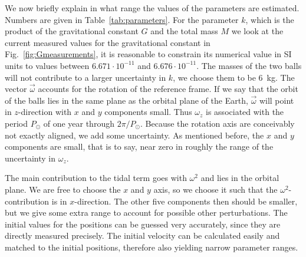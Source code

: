 \documentclass[]{rsos}
\begin{document}
We now briefly explain in what range the values of the parameters are
estimated.  Numbers are given in Table~\ref{tab:parameters}.  For the
parameter $k$, which is the product of the gravitational constant $G$
and the total mass $M$ we look at the current measured values for the
gravitational constant in Fig.~\ref{fig:Gmeasurements}, it is
reasonable to constrain its numerical value in SI units to values
between $6.671 \cdot 10^{-11}$ and $6.676 \cdot 10^{-11}$. The masses
of the two balls will not contribute to a larger uncertainty in $k$,
we choose them to be 6~kg.  The vector $\vec{\omega}$ accounts for the
rotation of the reference frame. If we say that the orbit of the balls
lies in the same plane as the orbital plane of the Earth,
$\vec{\omega}$ will point in $z$-direction with $x$ and $y$
components small. Thus $\omega_z$ is associated with the period
$P_\odot$ of one year through $2\pi/P_\odot$. Because the rotation
axis are conceivably not exactly aligned, we add some uncertainty. As
mentioned before, the $x$ and $y$ components are small, that is to
say, near zero in roughly the range of the uncertainty in
$\omega_z$.


The main contribution to the tidal term goes with $\omega^2$ and lies in the orbital plane. We are free to choose the $x$ and $y$ axis, so we choose it such that the $\omega^2$-contribution is in $x$-direction. The other five components then should be smaller, but we give some extra range to account for possible other perturbations.
The initial values for the positions can be guessed very accurately, since they are directly measured precisely. The initial velocity can be calculated easily and matched to the initial positions, therefore also yielding narrow parameter ranges.
\end{document}
